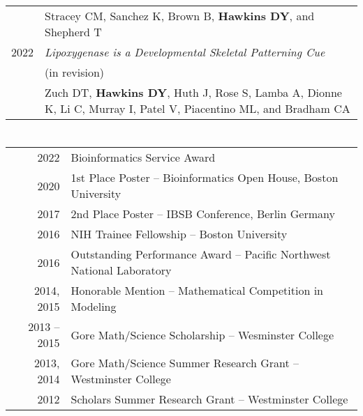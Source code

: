 \documentclass[a4paper,10pt]{report}
\begin{document}
\begin{tabular}{rp{10cm}}
	              & \footnotesize Stracey CM, Sanchez K, Brown B, \textbf{Hawkins DY}, and Shepherd T                                                                             \\
	\textsc{2022} & \emph{Lipoxygenase is a Developmental Skeletal Patterning Cue}                                                                                                \\
	              & \small (in revision)                                                                                                                                          \\
	              & \footnotesize Zuch DT, \textbf{Hawkins DY}, Huth J, Rose S, Lamba A, Dionne K, Li C, Murray I, Patel V, Piacentino ML, and Bradham CA                         \\
\end{tabular}


\section{\color{linkcolour}{Honors and Awards}}
\begin{tabular}{rl}
	2022         & Bioinformatics Service Award                                           \\
	2020         & 1st Place Poster -- Bioinformatics Open House, Boston University       \\
	2017         & 2nd Place Poster -- IBSB Conference, Berlin Germany                    \\
	2016         & NIH Trainee Fellowship -- Boston University                            \\
	2016         & Outstanding Performance Award -- Pacific Northwest National Laboratory \\
	2014, 2015   & Honorable Mention -- Mathematical Competition in Modeling              \\
	2013 -- 2015 & Gore Math/Science Scholarship -- Wesminster College                    \\
	2013, 2014   & Gore Math/Science Summer Research Grant -- Westminster College         \\
	2012         & Scholars Summer Research Grant -- Westminster College
\end{tabular}

\end{document}
